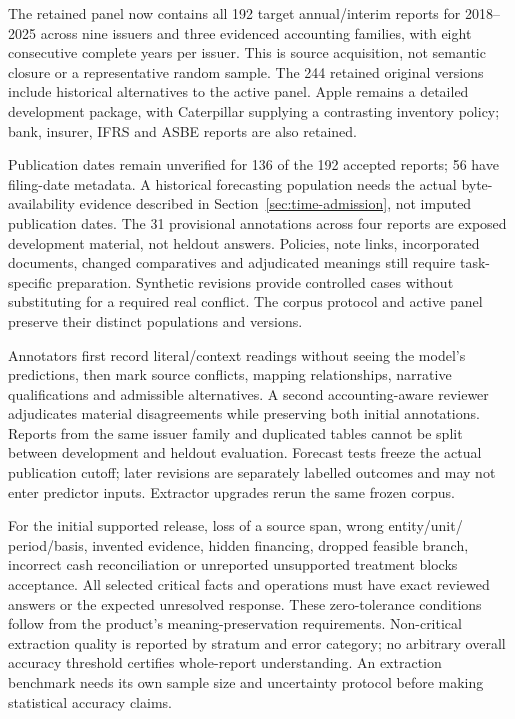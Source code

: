 The retained panel now contains all 192 target annual/interim reports for
2018--2025 across nine issuers and three evidenced accounting families, with
eight consecutive complete years per issuer. This is source acquisition, not
semantic closure or a representative random sample. The 244 retained original
versions include historical alternatives to the active panel. Apple remains
a detailed development package, with Caterpillar supplying a contrasting
inventory policy; bank, insurer, IFRS and ASBE reports are also retained.

Publication dates remain unverified for 136 of the 192 accepted reports; 56 have
filing-date metadata. A historical forecasting population needs the actual
byte-availability evidence described in Section~\ref{sec:time-admission},
not imputed publication dates. The 31 provisional annotations across four
reports are exposed development material, not heldout answers. Policies, note
links, incorporated documents, changed comparatives and adjudicated meanings
still require task-specific preparation. Synthetic revisions provide controlled
cases without substituting for a required real conflict. The corpus protocol
and active panel preserve their distinct populations and versions.

Annotators first record literal/context readings without seeing the model's
predictions, then mark source conflicts, mapping relationships, narrative
qualifications and admissible alternatives. A second accounting-aware reviewer
adjudicates material disagreements while preserving both initial annotations.
Reports from the same issuer family and duplicated tables cannot be split
between development and heldout evaluation. Forecast tests freeze the actual
publication cutoff; later revisions are separately labelled outcomes and may
not enter predictor inputs. Extractor upgrades rerun the same frozen corpus.

For the initial supported release, loss of a source span, wrong entity/unit/
period/basis, invented evidence, hidden financing, dropped feasible branch,
incorrect cash reconciliation or unreported unsupported treatment blocks
acceptance. All selected critical facts and operations must have exact
reviewed answers or the expected unresolved response. These zero-tolerance
conditions follow from the product's meaning-preservation requirements.
Non-critical extraction quality is reported by stratum and error category;
no arbitrary overall accuracy threshold certifies whole-report understanding.
An extraction benchmark needs its own sample size and uncertainty protocol
before making statistical accuracy claims.

